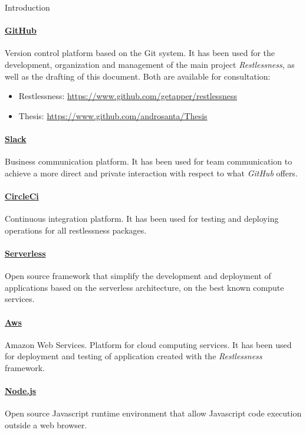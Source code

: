 \begin{chapter}{Introduction}
    \paragraph{\href{https://www.github.com}{GitHub}}
    Version control platform based on the Git system. It has been used for the development, organization and
    management of the main project \textit{Restlessness}, as well as the drafting of this document.
    Both are available for consultation:
    \begin{itemize}
        \item Restlessness: \url{https://www.github.com/getapper/restlessness}
        \item Thesis: \url{https://www.github.com/androsanta/Thesis}
    \end{itemize}

    \paragraph{\href{https://slack.com}{Slack}}
    Business communication platform. It has been used for team communication to achieve a more direct
    and private interaction with respect to what \textit{GitHub} offers.

    \paragraph{\href{https://circleci.com}{CircleCi}}
    Continuous integration platform. It has been used for testing and deploying operations
    for all restlessness packages.

    \paragraph{\href{https://www.serverless.com}{Serverless}}
    Open source framework that simplify the development and deployment of applications based on the
    serverless architecture, on the best known compute services.

    \paragraph{\href{https://aws.amazon.com}{Aws}}
    Amazon Web Services. Platform for cloud computing services. It has been used for deployment and
    testing of application created with the \textit{Restlessness} framework.

    \paragraph{\href{https://nodejs.org/en/}{Node.js}}
    Open source Javascript runtime environment that allow Javascript code execution outside a
    web browser.


\end{chapter}
